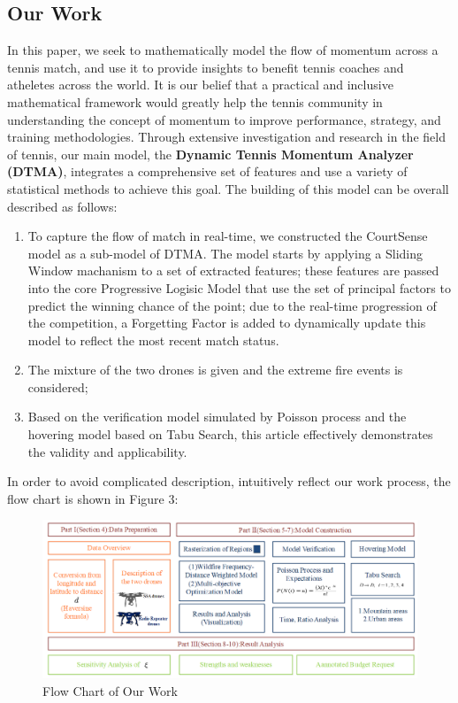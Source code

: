 \documentclass[12pt]{article}  %
\begin{document}
\subsection{Our Work}
In this paper, we seek to mathematically model the flow of momentum across a tennis match, and use it to provide insights to benefit tennis coaches and atheletes across the world. It is our belief that a practical and inclusive mathematical framework would greatly help the tennis community in understanding the concept of momentum to improve performance, strategy, and training methodologies. Through extensive investigation and research in the field of tennis, our main model, the \textbf{Dynamic Tennis Momentum Analyzer (DTMA)}, integrates a comprehensive set of features and use a variety of statistical methods to achieve this goal. The building of this model can be overall described as follows:
\begin{enumerate}[\bfseries (1)]
    \setlength{\parsep}{0ex} %
    \setlength{\topsep}{2ex} %
    \setlength{\itemsep}{1ex} %
    \item To capture the flow of match in real-time, we constructed the CourtSense model as a sub-model of DTMA. The model starts by applying a Sliding Window machanism to a set of extracted features; these features are passed into the core Progressive Logisic Model that use the set of principal factors to predict the winning chance of the point; due to the real-time progression of the competition, a Forgetting Factor is added to dynamically update this model to reflect the most recent match status. 
    \item The mixture of the two drones is given and the extreme fire events is considered;
    \item Based on the verification model simulated by Poisson process and the hovering model based on Tabu Search, this article effectively demonstrates the validity and applicability.
\end{enumerate}
In order to avoid complicated description, intuitively reflect our work process, the flow chart is shown in Figure 3:

\begin{figure}[htbp]  %
\centering  %
\includegraphics[width=.9\textwidth]{Flow_Chart.png} %
\caption{Flow Chart of Our Work} %
\end{figure}
\vspace{-0.8cm}
\end{document}
